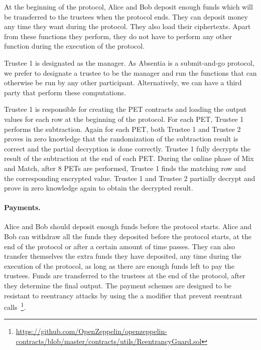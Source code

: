At the beginning of the protocol, Alice and Bob deposit enough funds which will be transferred to the trustees when the protocol ends. They can deposit money any time they want during the protocol. They also load their ciphertexts. Apart from these functions they perform, they do not have to perform any other function during the execution of the protocol. 
 
Trustee 1 is designated as the manager. As Absentia is a submit-and-go  protocol, we prefer to designate a trustee to be the manager and run the functions that can otherwise be run by any other participant. Alternatively, we can have a third party that perform these computations. 

Trustee 1 is responsible for creating the PET contracts and loading the output values for each row at the beginning of the protocol. For each PET, Trustee 1 performs the subtraction. Again for each PET, both Trustee 1 and Trustee 2 proves in zero knowledge that the randomization of the subtraction result is correct and the partial decryption is done correctly. Trustee 1 fully decrypts the result of the subtraction at the end of each PET. During the online phase of Mix and Match, after 8 PETs are performed, Trustee 1 finds the matching row and the corresponding encrypted value. Trustee 1 and Trustee 2 partially decrypt and prove in zero knowledge again to obtain the decrypted result.


\paragraph{Payments.}

Alice and Bob should deposit enough funds before the protocol starts. Alice and Bob can withdraw all the funds they deposited before the protocol starts, at the end of the protocol or after a certain amount of time passes. They can also transfer themselves the extra funds they have deposited, any time during the execution of the protocol, as long as there are enough funds left to pay the trustees. Funds are transferred to the trustees at the end of the protocol, after they determine the final output. The payment schemes are designed to be resistant to reentrancy attacks by using the a modifier that prevent reentrant calls~\footnote{\url{https://github.com/OpenZeppelin/openzeppelin-contracts/blob/master/contracts/utils/ReentrancyGuard.sol}}.


